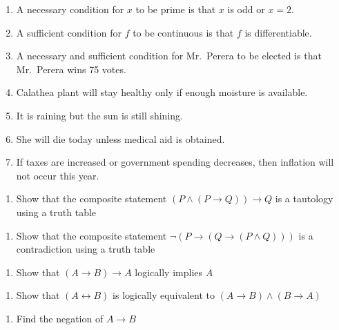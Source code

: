 \documentclass[]{book}
\providecommand{\tightlist}{%
  \setlength{\itemsep}{0pt}\setlength{\parskip}{0pt}}
\begin{document}
\begin{enumerate}
\def\labelenumi{(\alph{enumi})}
\item
  A necessary condition for \(x\) to be prime is that \(x\) is odd or \(x=2\).
\item
  A sufficient condition for \(f\) to be continuous is that \(f\) is differentiable.
\item
  A necessary and sufficient condition for Mr.~Perera to be elected is that Mr.~Perera wins 75 votes.
\item
  Calathea plant will stay healthy only if enough moisture is available.
\item
  It is raining but the sun is still shining.
\item
  She will die today unless medical aid is obtained.
\item
  If taxes are increased or government spending decreases, then inflation will not occur this year.
\end{enumerate}

\begin{enumerate}
\def\labelenumi{\arabic{enumi}.}
\setcounter{enumi}{1}
\tightlist
\item
  Show that the composite statement \((P \land (P \rightarrow Q)) \rightarrow Q\) is a tautology using a truth table
\end{enumerate}

\begin{enumerate}
\def\labelenumi{\arabic{enumi}.}
\setcounter{enumi}{2}
\tightlist
\item
  Show that the composite statement \(\lnot (P \rightarrow( Q \rightarrow (P \land Q)))\) is a contradiction using a truth table
\end{enumerate}

\begin{enumerate}
\def\labelenumi{\arabic{enumi}.}
\setcounter{enumi}{3}
\tightlist
\item
  Show that \((A \rightarrow B) \rightarrow A\)
  logically implies \(A\)
\end{enumerate}

\begin{enumerate}
\def\labelenumi{\arabic{enumi}.}
\setcounter{enumi}{4}
\tightlist
\item
  Show that \((A \leftrightarrow B)\) is
  logically equivalent to \((A \rightarrow B) \land (B \rightarrow A)\)
\end{enumerate}

\begin{enumerate}
\def\labelenumi{\arabic{enumi}.}
\setcounter{enumi}{5}
\tightlist
\item
  Find the negation of \(A\rightarrow B\)
\end{enumerate}
\end{document}
